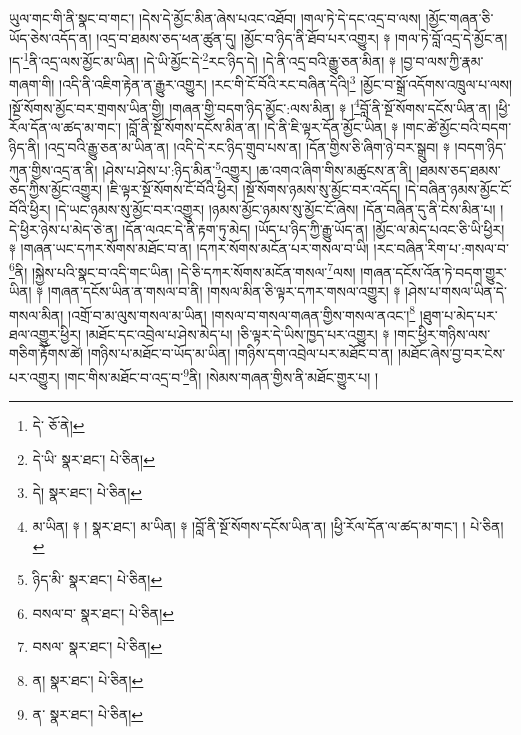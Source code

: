 ཡུལ་གང་གི་ནི་སྣང་བ་གང་། །དེས་དེ་མྱོང་མིན་ཞེས་པའང་འཐོབ། །གལ་ཏེ་དེ་དང་འདྲ་བ་ལས། །མྱོང་གཞན་ཅི་ཡོད་ཅེས་འདོད་ན། །འདྲ་བ་ཐམས་ཅད་ཕན་ཚུན་དུ། །མྱོང་བ་ཉིད་ནི་ཐོབ་པར་འགྱུར། ༈ །གལ་ཏེ་བློ་འདྲ་དེ་མྱོང་ན། །ད་\footnote{དེ་  ཅོ་ནེ། }ནི་འདྲ་ལས་མྱོང་མ་ཡིན། །དེ་ཡི་མྱོང་དེ་\footnote{དེ་ཡི་  སྣར་ཐང་།  པེ་ཅིན། }རང་ཉིད་དེ། །དེ་ནི་འདྲ་བའི་རྒྱུ་ཅན་མིན། ༈ །བྱ་བ་ལས་ཀྱི་རྣམ་གཞག་གི། །འདི་ནི་འཇིག་རྟེན་ན་རྒྱུར་འགྱུར། །རང་གི་ངོ་བོའི་རང་བཞིན་དེའི།\footnote{དེ།  སྣར་ཐང་།  པེ་ཅིན། } །མྱོང་བ་སྒྲོ་འདོགས་འཁྲུལ་པ་ལས། །སྔོ་སོགས་མྱོང་བར་གྲགས་ཡིན་གྱི། །གཞན་གྱི་བདག་ཉིད་མྱོང་:ལས་མིན། ༈ །\footnote{མ་ཡིན། ༈ །  སྣར་ཐང་། མ་ཡིན། ༈ །བློ་ནི་སྔོ་སོགས་དངོས་ཡིན་ན། །ཕྱི་རོལ་དོན་ལ་ཚད་མ་གང་། །  པེ་ཅིན། }བློ་ནི་སྔོ་སོགས་དངོས་ཡིན་ན། །ཕྱི་རོལ་དོན་ལ་ཚད་མ་གང་། །བློ་ནི་སྔོ་སོགས་དངོས་མིན་ན། །དེ་ནི་ཇི་ལྟར་དོན་མྱོང་ཡིན། ༈ །གང་ཚེ་མྱོང་བའི་བདག་ཉིད་ནི། །འདྲ་བའི་རྒྱུ་ཅན་མ་ཡིན་ན། །འདི་དེ་རང་ཉིད་གྲུབ་པས་ན། །དོན་གྱིས་ཅི་ཞིག་ཉེ་བར་སྒྲུབ། ༈ །བདག་ཉིད་ཀུན་གྱིས་འདྲ་ན་ནི། །ཤེས་པ་ཤེས་པ་:ཉིད་མིན་\footnote{ཉིད་མི་  སྣར་ཐང་།  པེ་ཅིན། }འགྱུར། །ཆ་འགའ་ཞིག་གིས་མཚུངས་ན་ནི། །ཐམས་ཅད་ཐམས་ཅད་ཀྱིས་མྱོང་འགྱུར། །ཇི་ལྟར་སྔོ་སོགས་ངོ་བོའི་ཕྱིར། །སྔོ་སོགས་ཉམས་སུ་མྱོང་བར་འདོད། །དེ་བཞིན་ཉམས་མྱོང་ངོ་བོའི་ཕྱིར། །དེ་ཡང་ཉམས་སུ་མྱོང་བར་འགྱུར། །ཉམས་མྱོང་ཉམས་སུ་མྱོང་ངོ་ཞེས། །དོན་བཞིན་དུ་ནི་ངེས་མིན་པ། །དེ་ཕྱིར་ཉེས་པ་མེད་ཅེ་ན། །དོན་ལའང་དེ་ནི་རྟག་ཏུ་མེད། །ཡོད་པ་ཉིད་ཀྱི་རྒྱུ་ཡོད་ན། །མྱོང་ལ་མེད་པའང་ཅི་ཡི་ཕྱིར། ༈ །གཞན་ཡང་དཀར་སོགས་མཐོང་བ་ན། །དཀར་སོགས་མངོན་པར་གསལ་བ་ཡི། །རང་བཞིན་རིག་པ་:གསལ་བ་\footnote{བསལ་བ་  སྣར་ཐང་།  པེ་ཅིན། }ནི། །སྐྱེས་པའི་སྣང་བ་འདི་གང་ཡིན། །དེ་ཅི་དཀར་སོགས་མངོན་གསལ་\footnote{བསལ་  སྣར་ཐང་།  པེ་ཅིན། }ལས། །གཞན་དངོས་འོན་ཏེ་བདག་གྱུར་ཡིན། ༈ །གཞན་དངོས་ཡིན་ན་གསལ་བ་ནི། །གསལ་མིན་ཅི་ལྟར་དཀར་གསལ་འགྱུར། ༈ །ཤེས་པ་གསལ་ཡིན་དེ་གསལ་མིན། །འགྲོ་བ་མ་ལུས་གསལ་མ་ཡིན། །གསལ་བ་གསལ་གཞན་གྱིས་གསལ་ནའང་།\footnote{ན།  སྣར་ཐང་།  པེ་ཅིན། } །ཐུག་པ་མེད་པར་ཐལ་འགྱུར་ཕྱིར། །མཐོང་དང་འབྲེལ་པ་ཤེས་མེད་པ། །ཅི་ལྟར་དེ་ཡིས་ཁྱད་པར་འགྱུར། ༈ །གང་ཕྱིར་གཉིས་ལས་གཅིག་རྟོགས་ཚེ། །གཉིས་པ་མཐོང་བ་ཡོད་མ་ཡིན། །གཉིས་དག་འབྲེལ་པར་མཐོང་བ་ན། །མཐོང་ཞེས་བྱ་བར་ངེས་པར་འགྱུར། །གང་གིས་མཐོང་བ་འདྲ་བ་\footnote{ན་  སྣར་ཐང་།  པེ་ཅིན། }ནི། །སེམས་གཞན་གྱིས་ནི་མཐོང་གྱུར་པ། །

